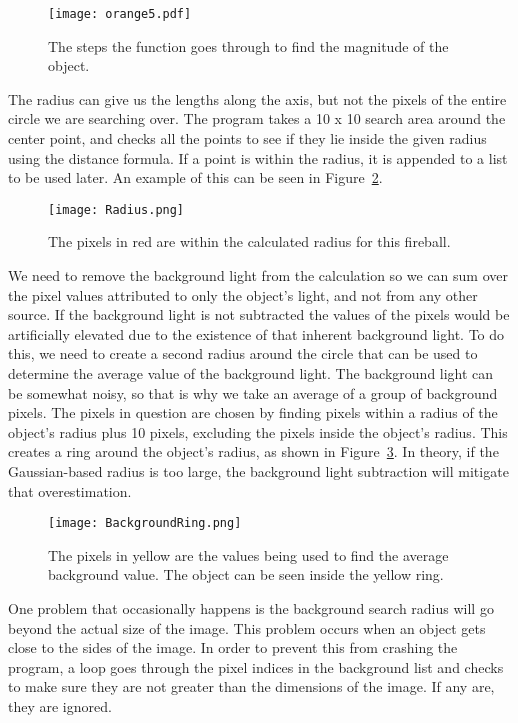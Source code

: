 \begin{figure}[htpb]
	\centering
	\texttt{[image: orange5.pdf]}
	\caption{The steps the function goes through to find the magnitude of the object.}
	\label{fig:magfinder}
\end{figure}

The radius can give us the lengths along the axis, but not the pixels of the entire circle we are searching over. The program takes a 10 x 10 search area around the center point, and checks all the points to see if they lie inside the given radius using the distance formula. If a point is within the radius, it is appended to a list to be used later. An example of this can be seen in Figure~\ref{fig:radius}.

\begin{figure}[ht!]
	\centering
	\texttt{[image: Radius.png]}
	\caption{The pixels in red are within the calculated radius for this fireball.}
	\label{fig:radius}
\end{figure}

We need to remove the background light from the calculation so we can sum over the pixel values attributed to only the object's light, and not from any other source. If the background light is not subtracted the values of the pixels would be artificially elevated due to the existence of that inherent background light. To do this, we need to create a second radius around the circle that can be used to determine the average value of the background light. The background light can be somewhat noisy, so that is why we take an average of a group of background pixels. The pixels in question are chosen by finding pixels within a radius of the object's radius plus 10 pixels, excluding the pixels inside the object's radius. This creates a ring around the object's radius, as shown in Figure~\ref{fig:background}. In theory, if the Gaussian-based radius is too large, the background light subtraction will mitigate that overestimation.

\begin{figure}[ht!]
	\centering
	\texttt{[image: BackgroundRing.png]}
	\caption{The pixels in yellow are the values being used to find the average background value. The object can be seen inside the yellow ring.}
	\label{fig:background}
\end{figure}

One problem that occasionally happens is the background search radius will go beyond the actual size of the image. This problem occurs when an object gets close to the sides of the image. In order to prevent this from crashing the program, a loop goes through the pixel indices in the background list and checks to make sure they are not greater than the dimensions of the image. If any are, they are ignored. 

